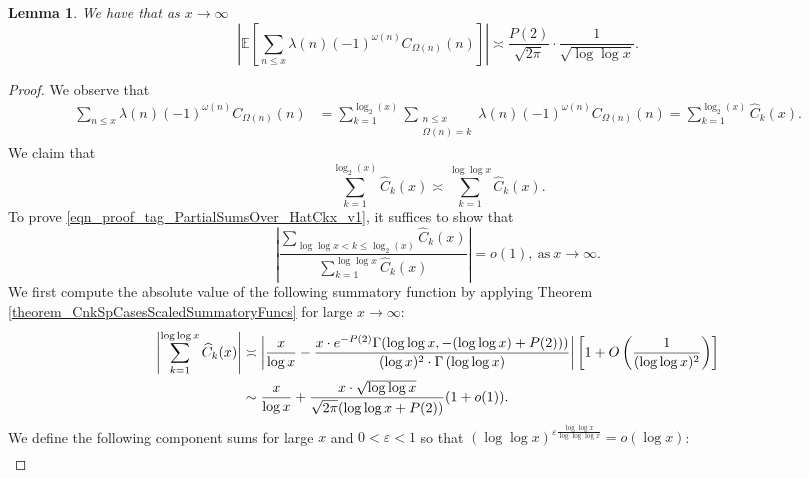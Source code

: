 \documentclass[11pt,reqno,a4letter]{article}
\numberwithin{figure}{section}
\numberwithin{table}{section}
\theoremstyle{plain}
\newtheorem{lemma}[theorem]{Lemma}
\numberwithin{theorem}{section}
\theoremstyle{definition}
\begin{document}
\begin{lemma} 
\label{lemma_HatCAstxSum_ExactFormulaWithError_v1} 
We have that as $x \rightarrow \infty$ 
\[
\left\lvert \mathbb{E}\left[ 
     \sum_{n \leq x} \lambda(n) (-1)^{\omega(n)} C_{\Omega(n)}(n) 
     \right] \right\rvert 
     \asymp \frac{P(2)}{\sqrt{2\pi}} \cdot \frac{1}{\sqrt{\log\log x}}. 
\] 
\end{lemma} 
\begin{proof} 
We observe that 
\begin{align*} 
\sum_{n \leq x} \lambda(n) (-1)^{\omega(n)} C_{\Omega(n)}(n) & = 
     \sum_{k=1}^{\log_2(x)} \sum_{\substack{n \leq x \\ \Omega(n) = k}} 
     \lambda(n) (-1)^{\omega(n)} C_{\Omega(n)}(n) 
     = 
     \sum_{k=1}^{\log_2(x)} \widehat{C}_k(x). 
\end{align*} 
We claim that 
\begin{equation} 
\label{eqn_proof_tag_PartialSumsOver_HatCkx_v1} 
\sum_{k=1}^{\log_2(x)} \widehat{C}_k(x) \asymp 
     \sum_{k=1}^{\log\log x} \widehat{C}_k(x). 
\end{equation} 
To prove \eqref{eqn_proof_tag_PartialSumsOver_HatCkx_v1}, it suffices to show that 
\begin{equation} 
\label{eqn_proof_tag_PartialSumsOver_HatCkx_EquivCond_v2} 
\left\lvert \frac{\sum\limits_{\log\log x < k \leq \log_2(x)} \widehat{C}_k(x)}{ 
     \sum\limits_{k=1}^{\log\log x} \widehat{C}_k(x)} \right\rvert = o(1), 
     \mathrm{\ as\ } x \rightarrow \infty. 
\end{equation} 
We first compute the absolute value of the following 
summatory function by applying 
Theorem \ref{theorem_CnkSpCasesScaledSummatoryFuncs} for large 
$x \rightarrow \infty$: 
\begin{align} 
\notag 
\left\lvert \sum_{k=1}^{\log\log x} \widehat{C}_k(x) \right\rvert & \asymp 
     \left\lvert \frac{x}{\log x} - \frac{x \cdot e^{-P(2)} \Gamma(\log\log x, -(\log\log x) + P(2)))}{ 
     (\log x)^2 \cdot \Gamma\left(\log\log x\right)} \right\rvert \left[
     1 + O\left(\frac{1}{(\log\log x)^2}\right)
     \right] \\ 
\label{eqn_proof_tag_PartialSumsOver_HatCkx_v3} 
     & \sim \frac{x}{\log x} + \frac{x \cdot \sqrt{\log\log x}}{\sqrt{2\pi} (\log\log x + P(2))} 
     (1 + o(1)). 
\end{align} 
We define the following component sums for large $x$ and $0 < \varepsilon < 1$ so that 
$(\log\log x)^{\varepsilon \frac{\log\log x}{\log\log\log x}} = o(\log x)$: 
\begin{align*} 

\end{align*}
\end{proof}
\end{document}
